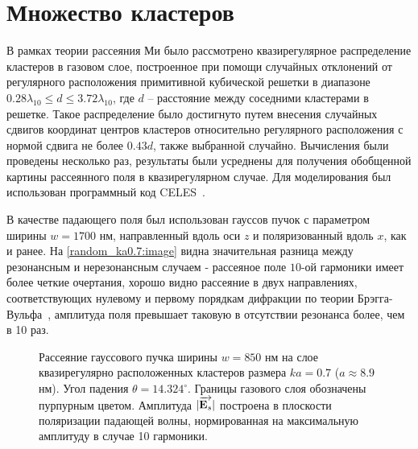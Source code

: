 \section{Множество кластеров}

В рамках теории рассеяния Ми было рассмотрено квазирегулярное распределение кластеров в газовом слое, построенное при помощи случайных отклонений от регулярного расположения примитивной кубической решетки в диапазоне $0.28\lambda_{10} \le d \le 3.72\lambda_{10}$, где $d$ -- расстояние между соседними кластерами в решетке. Такое распределение было достигнуто путем внесения случайных сдвигов координат центров кластеров относительно регулярного расположения с нормой сдвига не более $0.43d$, также выбранной случайно. Вычисления были проведены несколько раз, результаты были усреднены для получения обобщенной картины рассеянного поля в квазирегулярном случае. Для моделирования был использован программный код CELES~\cite{celes}.

В качестве падающего поля был использован гауссов пучок с параметром ширины $w = 1700$ нм, направленный вдоль оси $z$ и поляризованный вдоль $x$, как и ранее. На \autoref{random_ka0.7:image} видна значительная разница между резонансным и нерезонансным случаем - рассеяное поле $10$-ой гармоники имеет более четкие очертания, хорошо видно рассеяние в двух направлениях, соответствующих нулевому и первому порядкам дифракции по теории Брэгга-Вульфа~\cite{boren_huffman}, амплитуда поля превышает таковую в отсутствии резонанса более, чем в 10 раз.

\begin{figure}[H]
    \hfil
    \caption{Рассеяние гауссового пучка ширины $w = 850$ нм на слое квазирегулярно расположенных кластеров размера $ka = 0.7$ ($a \approx 8.9$ нм). Угол падения $\theta = 14.324^{\circ}$. Границы газового слоя обозначены пурпурным цветом. Амплитуда $|\overrightarrow{\textbf{E}_{s}}|$ построена в плоскости поляризации падающей волны, нормированная на максимальную амплитуду в случае 10 гармоники.}
    \label{random_ka0.7:image}
\end{figure}

